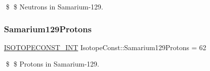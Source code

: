 \$ \$ Neutrons in Samarium-\/129. \mbox{\label{group___isotope_const-_samarium-_sm129_gad04a379086f9b1bcee7dba5e893584ea}} 
\subsubsection{\texorpdfstring{Samarium129\+Protons}{Samarium129Protons}}
{\footnotesize\ttfamily \mbox{\hyperlink{group___isotope_const-_macros_ga5f18360b3e99483a35c32d789e62621c}{I\+S\+O\+T\+O\+P\+E\+C\+O\+N\+S\+T\+\_\+\+I\+NT}} Isotope\+Const\+::\+Samarium129\+Protons = 62}

\$ \$ Protons in Samarium-\/129. 